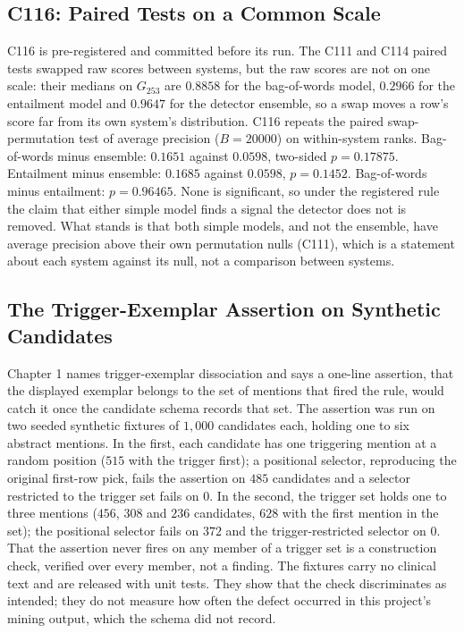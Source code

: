 \subsection{C116: Paired Tests on a Common Scale}
\label{sup:sec:s5-c116}

C116 is pre-registered and committed before its run. The C111 and C114 paired tests swapped raw
scores between systems, but the raw scores are not on one scale: their medians on $G_{253}$ are
$0.8858$ for the bag-of-words model, $0.2966$ for the entailment model and $0.9647$ for the detector
ensemble, so a swap moves a row's score far from its own system's distribution. C116 repeats the
paired swap-permutation test of average precision ($B = 20000$) on within-system ranks. Bag-of-words
minus ensemble: $0.1651$ against $0.0598$, two-sided $p = 0.17875$. Entailment minus ensemble:
$0.1685$ against $0.0598$, $p = 0.1452$. Bag-of-words minus entailment: $p = 0.96465$. None is
significant, so under the registered rule the claim that either simple model finds a signal the
detector does not is removed. What stands is that both simple models, and not the ensemble, have
average precision above their own permutation nulls (C111), which is a statement about each system
against its null, not a comparison between systems.

\subsection{The Trigger-Exemplar Assertion on Synthetic Candidates}
\label{sup:sec:s5-assertion}

Chapter 1 names trigger-exemplar dissociation and says a one-line assertion, that the displayed
exemplar belongs to the set of mentions that fired the rule, would catch it once the candidate
schema records that set. The assertion was run on two seeded synthetic fixtures of $1{,}000$
candidates each, holding one to six abstract mentions. In the first, each candidate has one
triggering mention at a random position ($515$ with the trigger first); a positional selector,
reproducing the original first-row pick, fails the assertion on $485$ candidates and a selector
restricted to the trigger set fails on $0$. In the second, the trigger set holds one to three
mentions ($456$, $308$ and $236$ candidates, $628$ with the first mention in the set); the positional
selector fails on $372$ and the trigger-restricted selector on $0$. That the assertion never fires on
any member of a trigger set is a construction check, verified over every member, not a finding. The
fixtures carry no clinical text and are released with unit tests. They show that the check
discriminates as intended; they do not measure how often the defect occurred in this project's
mining output, which the schema did not record.

